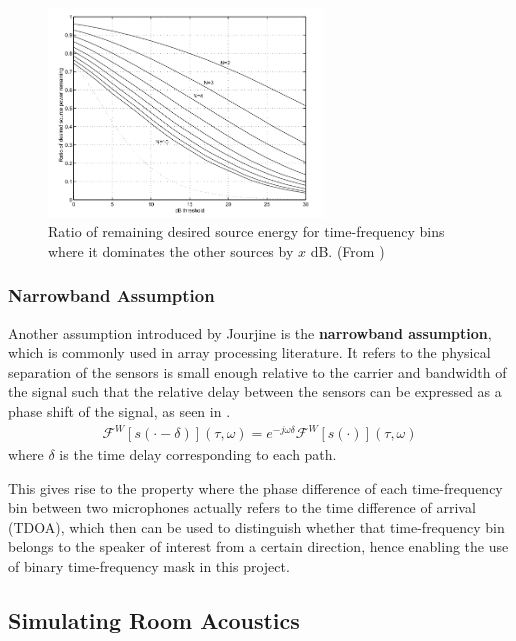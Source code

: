 \documentclass[a4paper,twoside,12pt,hidelinks]{article}
\begin{document}
\begin{figure}[H]
\begin{center}
\includegraphics[width=0.65\textwidth]{wortho}
\end{center}
\caption{Ratio of remaining desired source energy for time-frequency bins where it dominates the other sources by $x$ dB. (From \cite{Rickard2002OnSpeech})}
\label{fig:wortho}
\end{figure}

\subsubsection{Narrowband Assumption}
Another assumption introduced by Jourjine \cite{JourjineBlindMixtures} is the \textbf{narrowband assumption}, which is commonly used in array processing literature. It refers to the physical separation of the sensors is small enough relative to the carrier and bandwidth of the signal such that the relative delay between the sensors can be expressed as a phase shift of the signal, as seen in . 
\begin{align}
\mathcal{F}^W[s(\cdot-\delta)](\tau,\omega) = e^{-j\omega\delta}\mathcal{F}^W[s(\cdot)](\tau,\omega) \label{eq1}
\end{align}
where $\delta$ is the time delay corresponding to each path.

This gives rise to the property where the phase difference of each time-frequency bin between two microphones actually refers to the time difference of arrival (TDOA), which then can be used to distinguish whether that time-frequency bin belongs to the speaker of interest from a certain direction, hence enabling the use of binary time-frequency mask in this project.

\subsection{Simulating Room Acoustics}
\end{document}
